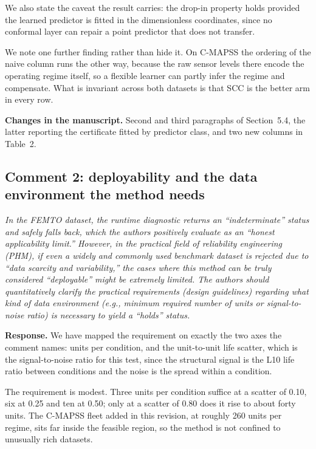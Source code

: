 \documentclass[11pt,a4paper]{article}
\newenvironment{comment}
  {\begin{list}{}{\leftmargin=6mm \rightmargin=2mm}\item[]\color{quoteline}\itshape}
  {\end{list}}
\newcommand{\where}[1]{\textbf{Changes in the manuscript.} #1}
\begin{document}
We also state the caveat the result carries: the drop-in property holds provided the learned
predictor is fitted in the dimensionless coordinates, since no conformal layer can repair a point
predictor that does not transfer.

We note one further finding rather than hide it. On C-MAPSS the ordering of the naive column runs
the other way, because the raw sensor levels there encode the operating regime itself, so a flexible
learner can partly infer the regime and compensate. What is invariant across both datasets is that
SCC is the better arm in every row.

\where{Second and third paragraphs of Section~5.4, the latter reporting the certificate fitted by
predictor class, and two new columns in Table~2.}

\subsection*{Comment 2: deployability and the data environment the method needs}
\begin{comment}
In the FEMTO dataset, the runtime diagnostic returns an ``indeterminate'' status and safely falls
back, which the authors positively evaluate as an ``honest applicability limit.'' However, in the
practical field of reliability engineering (PHM), if even a widely and commonly used benchmark
dataset is rejected due to ``data scarcity and variability,'' the cases where this method can be
truly considered ``deployable'' might be extremely limited. The authors should quantitatively
clarify the practical requirements (design guidelines) regarding what kind of data environment
(e.g., minimum required number of units or signal-to-noise ratio) is necessary to yield a ``holds''
status.
\end{comment}

\noindent\textbf{Response.} We have mapped the requirement on exactly the two axes the comment
names: units per condition, and the unit-to-unit life scatter, which is the signal-to-noise ratio
for this test, since the structural signal is the L10 life ratio between conditions and the noise is
the spread within a condition.

The requirement is modest. Three units per condition suffice at a scatter of 0.10, six at 0.25 and
ten at 0.50; only at a scatter of 0.80 does it rise to about forty units. The C-MAPSS fleet added in
this revision, at roughly 260 units per regime, sits far inside the feasible region, so the method
is not confined to unusually rich datasets.
\end{document}
